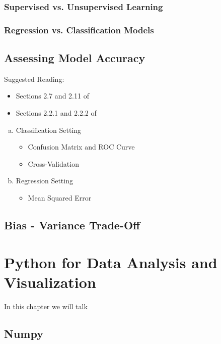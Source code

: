 \documentclass[11pt]{article}
\theoremstyle{plain}
\theoremstyle{definition}
\begin{document}
\subsubsection{Supervised vs. Unsupervised Learning}

\subsubsection{Regression vs. Classification Models}

\subsection{Assessing Model Accuracy}

Suggested Reading:

\begin{itemize}
\item Sections 2.7 and 2.11 of \cite{wilmott}
\item Sections 2.2.1 and 2.2.2 of \cite{ISLR}
\end{itemize}

\begin{enumerate}[(a)]
\item Classification Setting
\begin{itemize}
\item Confusion Matrix and ROC Curve
\item Cross-Validation
\end{itemize}

\item Regression Setting
\begin{itemize}
\item Mean Squared Error
\end{itemize}
\end{enumerate}

\subsection{Bias - Variance Trade-Off}

\newpage
\section{Python for Data Analysis and Visualization}

In this chapter we will talk



\subsection{Numpy}
\end{document}
